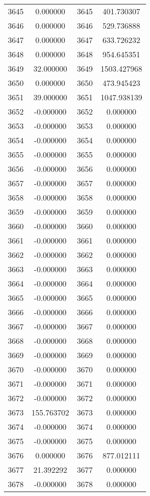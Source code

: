 \documentclass[12pt]{article}
\begin{document}
\begin{longtable}{@{}cccc@{}}
3645 & 0.000000 & 3645 & 401.730307 \\
3646 & 0.000000 & 3646 & 529.736888 \\
3647 & 0.000000 & 3647 & 633.726232 \\
3648 & 0.000000 & 3648 & 954.645351 \\
3649 & 32.000000 & 3649 & 1503.427968 \\
3650 & 0.000000 & 3650 & 473.945423 \\
3651 & 39.000000 & 3651 & 1047.938139 \\
3652 & -0.000000 & 3652 & 0.000000 \\
3653 & -0.000000 & 3653 & 0.000000 \\
3654 & -0.000000 & 3654 & 0.000000 \\
3655 & -0.000000 & 3655 & 0.000000 \\
3656 & -0.000000 & 3656 & 0.000000 \\
3657 & -0.000000 & 3657 & 0.000000 \\
3658 & -0.000000 & 3658 & 0.000000 \\
3659 & -0.000000 & 3659 & 0.000000 \\
3660 & -0.000000 & 3660 & 0.000000 \\
3661 & -0.000000 & 3661 & 0.000000 \\
3662 & -0.000000 & 3662 & 0.000000 \\
3663 & -0.000000 & 3663 & 0.000000 \\
3664 & -0.000000 & 3664 & 0.000000 \\
3665 & -0.000000 & 3665 & 0.000000 \\
3666 & -0.000000 & 3666 & 0.000000 \\
3667 & -0.000000 & 3667 & 0.000000 \\
3668 & -0.000000 & 3668 & 0.000000 \\
3669 & -0.000000 & 3669 & 0.000000 \\
3670 & -0.000000 & 3670 & 0.000000 \\
3671 & -0.000000 & 3671 & 0.000000 \\
3672 & -0.000000 & 3672 & 0.000000 \\
3673 & 155.763702 & 3673 & 0.000000 \\
3674 & -0.000000 & 3674 & 0.000000 \\
3675 & -0.000000 & 3675 & 0.000000 \\
3676 & 0.000000 & 3676 & 877.012111 \\
3677 & 21.392292 & 3677 & 0.000000 \\
3678 & -0.000000 & 3678 & 0.000000 \\

\end{longtable}
\end{document}
